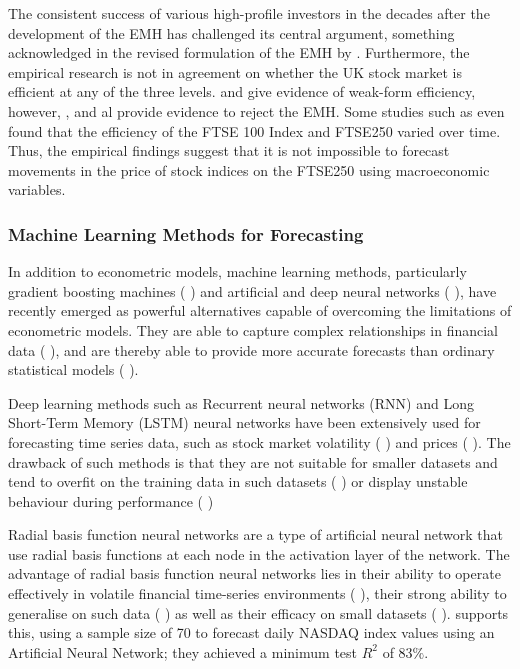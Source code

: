 \documentclass[11pt,a4paper]{article}
\newcommand{\citeboth}[1]{\citeauthor{#1} \citep{#1}}
\begin{document}
The consistent success of various high-profile investors in the decades 
after the development of the EMH has challenged 
its central argument, something acknowledged in the revised formulation of the EMH 
by \citeboth{fama1991}. Furthermore, the empirical research is not in 
agreement on whether the UK stock market is efficient at any of the three levels. 
\citeboth{libberton2010} and \citeboth{rounaghi} give evidence of weak-form efficiency,
however, \citeboth{borges2010}, \citeboth{asghar2023} and \citeboth{bhavsar2015} al provide evidence to reject the EMH. 
Some studies such as \citeboth{rosini2020} even found that the 
efficiency of the FTSE 100 Index and FTSE250 varied over time. Thus, the empirical findings suggest 
that it is not impossible to forecast movements in the 
price of stock indices on the FTSE250 using macroeconomic variables.



\subsubsection{Machine Learning Methods for Forecasting}

In addition to econometric models, machine learning methods, 
particularly gradient boosting machines (\citeboth{gumelar,Liu2024,Chen2023}) and artificial and deep neural networks (\citeboth{chen2015lstm,kara2011ann,long2019deep,nelson2017lstm}), have recently emerged as powerful alternatives capable of overcoming the limitations of econometric models. 
They are able to capture complex relationships in financial data (\citeboth{rossi2018ml}), and 
are thereby able to provide more accurate forecasts than ordinary statistical models 
(\citeboth{lapitskaya2021armax}). 


Deep learning methods such as Recurrent neural networks (RNN) and Long Short-Term Memory (LSTM) neural networks
have been extensively used for forecasting time series data, 
such as stock market volatility (\citeboth{cho2022forecasting,praveenraj2023}) and prices (\citeboth{zhang2022lstm,song2023forecasting,dutta2024hybrid}). The drawback of such 
methods is that they are not suitable for smaller datasets and tend to overfit on the training data
in such datasets (\citeboth{foster1992}) or display unstable behaviour during performance (\citeboth{lebaron1998})

Radial basis function neural networks are a type of artificial 
neural network that use radial basis functions at each node in the 
activation layer of the network.
The advantage of radial basis function neural networks lies in their ability to 
operate effectively in volatile financial time-series 
environments (\citeboth{cafferata2019}), their strong ability to 
generalise on such data (\citeboth{sharkawy2020}) as well as their efficacy on small datasets (\citeboth{kosarac2022}). 
\citeboth{esfandyari2016}
supports this, using a sample size of 70 to forecast daily NASDAQ 
index values using an Artificial Neural Network; they achieved a minimum
test $R^2$ of 83$\%$. 
\end{document}
